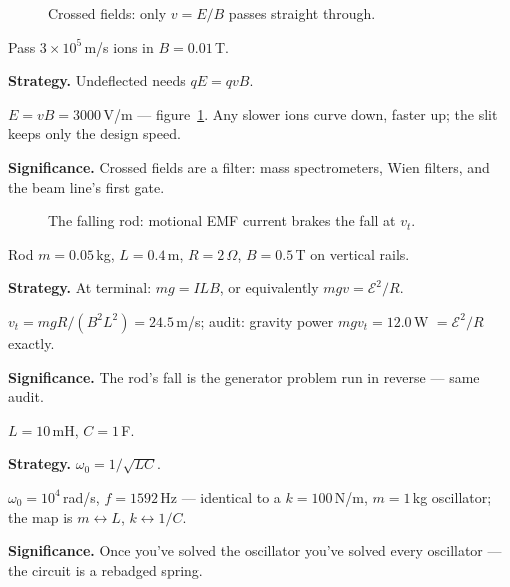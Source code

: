 \begin{figure}[htbp]\centering

\caption{Crossed fields: only $v=E/B$ passes straight through.}
\label{fig:sel}
\end{figure}

\begin{example}\label{ex:w17}
Pass $3\times10^{5}$\,m/s ions in $B=0.01$\,T.
\par\smallskip
\textbf{Strategy.} Undeflected needs $qE=qvB$.
\begin{solution}
$E=vB=3000$\,V/m --- figure~\ref{fig:sel}. Any slower ions curve
down, faster up; the slit keeps only the design speed. \checkmark
\end{solution}
\textbf{Significance.} Crossed fields are a filter: mass
spectrometers, Wien filters, and the beam line's first gate.
\end{example}

\begin{figure}[htbp]\centering

\caption{The falling rod: motional EMF current brakes the fall at
$v_t$.}
\label{fig:fallrod}
\end{figure}

\begin{example}\label{ex:w18}
Rod $m=0.05$\,kg, $L=0.4$\,m, $R=2\,\Omega$, $B=0.5$\,T on vertical
rails.
\par\smallskip
\textbf{Strategy.} At terminal: $mg=ILB$, or equivalently
$mgv=\mathcal E^{2}/R$.
\begin{solution}
$v_t=mgR/(B^{2}L^{2})=24.5$\,m/s; audit: gravity power
$mgv_t=12.0$\,W $=\mathcal E^{2}/R$ exactly. \checkmark
\end{solution}
\textbf{Significance.} The rod's fall is the generator problem run in
reverse --- same audit.
\end{example}

\begin{example}\label{ex:w19}
$L=10$\,mH, $C=1$\,\textmu F.
\par\smallskip
\textbf{Strategy.} $\omega_0=1/\sqrt{LC}$.
\begin{solution}
$\omega_0=10^{4}$\,rad/s, $f=1592$\,Hz --- identical to a
$k=100$\,N/m, $m=1$\,kg oscillator; the map is
$m\leftrightarrow L$, $k\leftrightarrow1/C$. \checkmark
\end{solution}
\textbf{Significance.} Once you've solved the oscillator you've solved
every oscillator --- the circuit is a rebadged spring.
\end{example}

